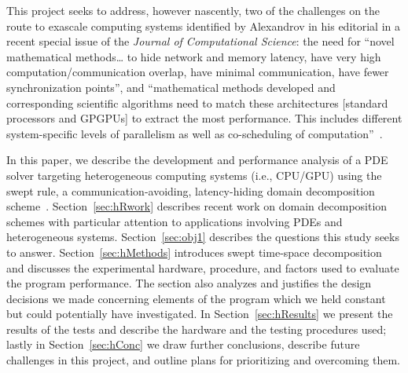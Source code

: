 This project seeks to address, however nascently, two of the challenges on the route to
exascale computing systems identified by Alexandrov in his editorial in a recent special issue of the
\textit{Journal of Computational Science}:
the need for ``novel mathematical methods\dots{} to hide network and memory latency, have very
high computation\slash communication overlap, have minimal communication, have fewer synchronization points'',
and ``mathematical methods developed and corresponding scientific algorithms need to match these
architectures [standard processors and GPGPUs] to extract the most performance. This includes
different system-specific levels of parallelism as well as co-scheduling of computation''~\cite{ALEXANDROV20161}.

In this paper, we describe the development and performance analysis of a PDE solver targeting
heterogeneous computing systems (i.e., CPU\slash GPU) using the swept rule, a communication-avoiding,
latency-hiding domain decomposition scheme~\cite{alhubail:16jcp,Alhubail:2016arxiv}.
Section~\ref{sec:hRwork} describes recent work on domain decomposition schemes with particular
attention to applications involving PDEs and heterogeneous systems.
Section~\ref{sec:obj1} describes the questions this study seeks to answer.
Section~\ref{sec:hMethods} introduces swept time-space decomposition and discusses the experimental
hardware, procedure, and factors used to evaluate the program performance.
The section also analyzes and justifies the design decisions we made concerning elements
of the program which we held constant but could potentially have investigated.
In Section~\ref{sec:hResults} we present the results of the tests and describe the hardware
and the testing procedures used; lastly in Section~\ref{sec:hConc} we draw further conclusions,
describe future challenges in this project, and outline plans for prioritizing and overcoming them.
